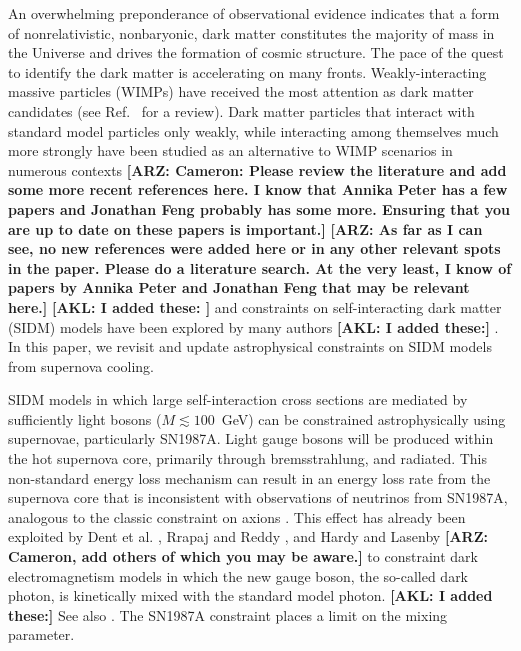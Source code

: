 \documentclass[nofootinbib,prd,superscriptaddress,twocolumn]{revtex4}
\newcommand{\arz}[1]{{{\bf{\color{BrickRed}[ARZ: #1]}}}}
\newcommand{\akl}[1]{{{\bf{\color{Blue}[AKL: #1]}}}}
\begin{document}
An overwhelming preponderance of observational evidence indicates that a form of nonrelativistic, nonbaryonic, 
dark matter constitutes the majority of mass in the Universe and drives the formation of cosmic structure. 
The pace of the quest to identify the dark matter is accelerating on many fronts. Weakly-interacting massive 
particles (WIMPs) have received the most attention as dark matter candidates (see Ref.~\cite{jungman_etal96} for a review). 
Dark matter particles that interact with standard model particles only weakly, while interacting among themselves 
much more strongly have been studied as an alternative to WIMP scenarios in numerous contexts 
\cite{carlson_etal92,deLaix_etal95,atrio-barandela_davidson97,spergel_steinhardt00,hogan_dalcanton00,mohapatra_teplitz00,
dave_etal01,hisano_etal04,hisano_etal05,pospelov_etal08,arkani-hamed_etal08a,lattanzi_silk08,ackerman_etal09,feng_etal09,
kong_etal15} \arz{Cameron: Please review the literature and add some more recent references here. 
I know that Annika Peter has a few papers and Jonathan Feng probably has some more. 
Ensuring that you are up to date on these papers is important.} \arz{As far as I can see, no new 
references were added here or in any other relevant spots in the paper. Please do a literature search. At the very least, 
I know of papers by Annika Peter and Jonathan Feng that may be relevant here.} \akl{I added these: }\cite{Buckley:2009in,Boddy:2014yra,Boddy:2014qxa,Boddy:2016bbu}
and constraints on self-interacting dark matter (SIDM) models have been explored by many authors \cite{yoshida_etal00,gnedin_ostriker01,miralda-escude02,randall_etal08,kamionkowski_profumo08,zentner09,robertson_zentner09,pieri_etal09,spolyar_etal09,finkbeiner_etal09,slatyer_etal09,bramante_etal14,albuquerque_etal14,kaplinghat_etal14,chen_etal14,feng_etal16,catena_widmark16} \akl{I added these:} \cite{Markevitch:2003at,Zavala:2012us,Rocha:2012jg,Peter:2012jh,Kahlhoefer:2013dca,Elbert:2014bma,Feng:2015hja,DelNobile:2015uua,Feng:2016ijc,Dooley:2016ajo,Kim:2016ujt,Bringmann:2016din}. 
In this paper, we revisit and update astrophysical constraints on SIDM models from supernova cooling.


SIDM models in which large self-interaction cross sections are mediated by sufficiently light 
bosons ($M \lesssim 100$~GeV) can be constrained astrophysically using supernovae, particularly 
SN1987A. Light gauge bosons will be produced within the hot supernova core, primarily through 
bremsstrahlung, and radiated. This non-standard energy loss mechanism can result in an energy loss rate 
from the supernova core that is inconsistent with observations of neutrinos from SN1987A, 
analogous to the classic constraint on axions \cite{turner88,raffelt96_book}. 
This effect has already been exploited by Dent et al. \cite{dent_etal12}, Rrapaj and Reddy \cite{rrapaj_reddy16}, and 
Hardy and Lasenby \cite{hardy_lasenby17} \arz{Cameron, add others of which you may be aware.}
to constraint dark electromagnetism models in which the new gauge boson, the so-called dark photon, 
is kinetically mixed with the standard model photon. \akl{I added these:} See also \cite{Kazanas:2014mca,Zhang:2014wra,Chang:2016ntp}. The SN1987A constraint places a limit on the mixing parameter. 
\end{document}
